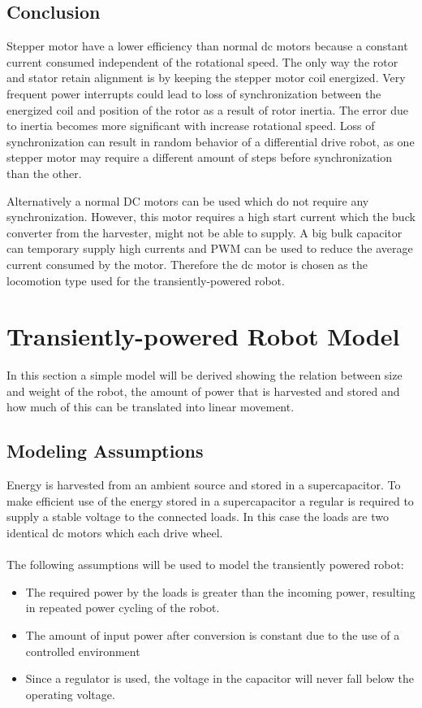 \subsection{Conclusion}
Stepper motor have a lower efficiency than normal dc motors because a constant current consumed independent of the rotational speed.
The only way the rotor and stator retain alignment is by keeping the stepper motor coil energized.
Very frequent power interrupts could lead to loss of synchronization between the energized coil and position of the rotor as a result of rotor inertia.
The error due to inertia becomes more significant with increase rotational speed.
Loss of synchronization can result in random behavior of a differential drive robot, as one stepper motor may require a different amount of steps before synchronization than the other.

Alternatively a normal DC motors can be used which do not require any synchronization.
However, this motor requires a high start current which the buck converter from the harvester, might not be able to supply.
A big bulk capacitor can temporary supply high currents and PWM can be used to reduce the average current consumed by the motor.
Therefore the dc motor is chosen as the locomotion type used for the transiently-powered robot.

\section{Transiently-powered Robot Model}
\label{sec:pre_transient_model}

In this section a simple model will be derived showing the relation between size and weight of the robot, the amount of power that is harvested and stored and how much of this can be translated into linear movement.

\subsection{Modeling Assumptions}

Energy is harvested from an ambient source and stored in a supercapacitor.
To make efficient use of the energy stored in a supercapacitor a regular is required to supply a stable voltage to the connected loads.
In this case the loads are two identical dc motors which each drive wheel. \\
\\ \noindent
The following assumptions will be used to model the transiently powered robot:
\begin{itemize}
	\item The required power by the loads is greater than the incoming power, resulting in repeated power cycling of the robot.
	\item The amount of input power after conversion is constant due to the use of a controlled environment
	\item Since a regulator is used, the voltage in the capacitor will never fall below the operating voltage.
\end{itemize}

